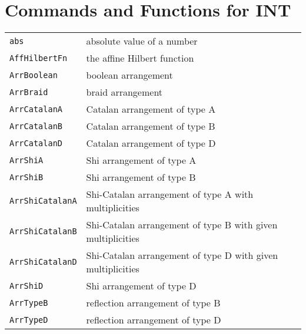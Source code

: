 \documentclass[a4paper]{mybook}
\begin{document}
\section{Commands and Functions for INT}
\label{Commands and Functions for INT}

        

\begin{center}
\begin{longtable}{ll}
   
{\verb~abs~} &
      absolute value of a number\\
   
{\verb~AffHilbertFn~} &
      the affine Hilbert function\\
   
{\verb~ArrBoolean~} &
      boolean arrangement\\
   
{\verb~ArrBraid~} &
      braid arrangement\\
   
{\verb~ArrCatalanA~} &
      Catalan arrangement of type A\\
   
{\verb~ArrCatalanB~} &
      Catalan arrangement of type B\\
   
{\verb~ArrCatalanD~} &
      Catalan arrangement of type D\\
   
{\verb~ArrShiA~} &
      Shi arrangement of type A\\
   
{\verb~ArrShiB~} &
      Shi arrangement of type B\\
   
{\verb~ArrShiCatalanA~} &
      Shi-Catalan arrangement of type A with multiplicities\\
   
{\verb~ArrShiCatalanB~} &
      Shi-Catalan arrangement of type B with given multiplicities\\
   
{\verb~ArrShiCatalanD~} &
      Shi-Catalan arrangement of type D with given multiplicities\\
   
{\verb~ArrShiD~} &
      Shi arrangement of type D\\
   
{\verb~ArrTypeB~} &
      reflection arrangement of type B\\
   
{\verb~ArrTypeD~} &
      reflection arrangement of type D\\
   

\end{longtable}
\end{center}
\end{document}
